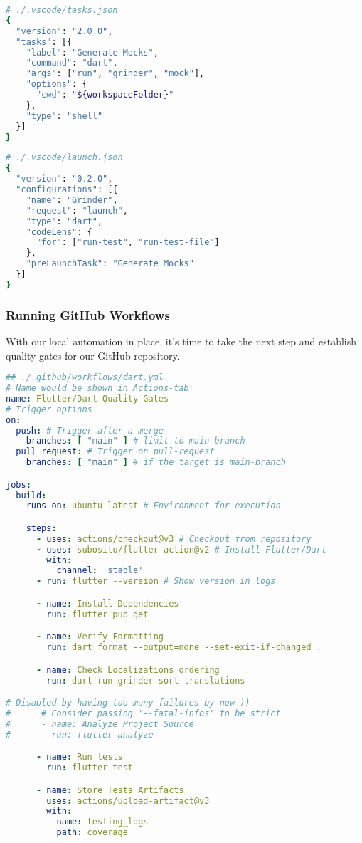 \begin{lstlisting}[language=bash]
# ./.vscode/tasks.json
{
  "version": "2.0.0",
  "tasks": [{
    "label": "Generate Mocks",
    "command": "dart",
    "args": ["run", "grinder", "mock"],
    "options": {
      "cwd": "${workspaceFolder}"
    },
    "type": "shell"
  }]
}
\end{lstlisting}
\begin{lstlisting}[language=bash]
# ./.vscode/launch.json
{
  "version": "0.2.0",
  "configurations": [{
    "name": "Grinder",
    "request": "launch",
    "type": "dart",
    "codeLens": {
      "for": ["run-test", "run-test-file"]
    },
    "preLaunchTask": "Generate Mocks"
  }]
}
\end{lstlisting}



\subsubsection{Running GitHub Workflows}

With our local automation in place, it's time to take the next step and establish quality gates for our GitHub repository.

\begin{lstlisting}[language=yaml]
## ./.github/workflows/dart.yml
# Name would be shown in Actions-tab
name: Flutter/Dart Quality Gates
# Trigger options
on:
  push: # Trigger after a merge
    branches: [ "main" ] # limit to main-branch
  pull_request: # Trigger on pull-request
    branches: [ "main" ] # if the target is main-branch

jobs:
  build:
    runs-on: ubuntu-latest # Environment for execution

    steps:
      - uses: actions/checkout@v3 # Checkout from repository
      - uses: subosito/flutter-action@v2 # Install Flutter/Dart
        with:
          channel: 'stable'
      - run: flutter --version # Show version in logs

      - name: Install Dependencies
        run: flutter pub get

      - name: Verify Formatting
        run: dart format --output=none --set-exit-if-changed .

      - name: Check Localizations ordering
        run: dart run grinder sort-translations

# Disabled by having too many failures by now ))
#      # Consider passing '--fatal-infos' to be strict
#      - name: Analyze Project Source
#        run: flutter analyze

      - name: Run tests
        run: flutter test

      - name: Store Tests Artifacts
        uses: actions/upload-artifact@v3
        with:
          name: testing_logs
          path: coverage
\end{lstlisting}

